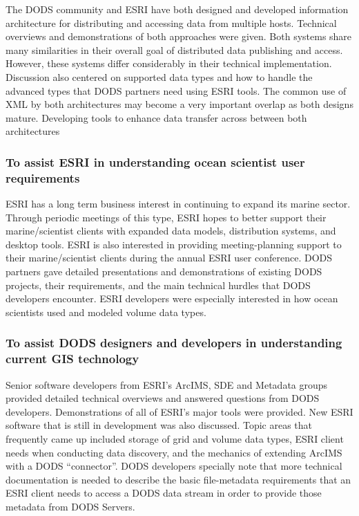 The DODS community and ESRI have both designed and developed information architecture for 
distributing and accessing data from multiple hosts. Technical overviews and demonstrations of 
both approaches were given. Both systems share many similarities in their overall goal of 
distributed data publishing and access. However, these systems differ considerably in their 
technical implementation. Discussion also centered on supported data types and how to handle 
the advanced types that DODS partners need using ESRI tools. The common use of XML by 
both architectures may become a very important overlap as both designs mature. Developing 
tools to enhance data transfer across between both architectures 

\subsubsection{To assist ESRI in understanding ocean scientist user requirements}

ESRI has a long term business interest in continuing to expand its marine sector. Through 
periodic meetings of this type, ESRI hopes to better support their marine/scientist clients with 
expanded data models, distribution systems, and desktop tools. ESRI is also interested in 
providing meeting-planning support to their marine/scientist clients during the annual ESRI user 
conference. DODS partners gave detailed presentations and demonstrations of existing DODS 
projects, their requirements, and the main technical hurdles that DODS developers encounter. 
ESRI developers were especially interested in how ocean scientists used and modeled volume 
data types.



\subsubsection{To assist DODS designers and developers in understanding current GIS technology}

Senior software developers from ESRI's ArcIMS, SDE and Metadata groups provided detailed 
technical overviews and answered questions from DODS developers. Demonstrations of all of 
ESRI's major tools were provided. New ESRI software that is still in development was also 
discussed. Topic areas that frequently came up included storage of grid and volume data types, 
ESRI client needs when conducting data discovery, and the mechanics of extending ArcIMS 
with a DODS ``connector''. DODS developers specially note that more technical documentation 
is needed to describe the basic file-metadata requirements that an ESRI client needs to access a 
DODS data stream in order to provide those metadata from DODS Servers.


